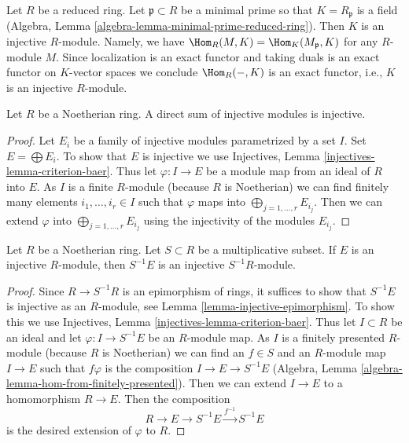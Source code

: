 \begin{example}
\label{example-reduced-ring-injective}
Let $R$ be a reduced ring. Let $\mathfrak p \subset R$ be a minimal prime
so that $K = R_\mathfrak p$ is a field
(Algebra, Lemma \ref{algebra-lemma-minimal-prime-reduced-ring}).
Then $K$ is an injective $R$-module. Namely, we have
$\Hom_R(M, K) = \Hom_K(M_\mathfrak p, K)$ for any $R$-module
$M$. Since localization is an exact functor and taking duals is
an exact functor on $K$-vector spaces we conclude $\Hom_R(-, K)$
is an exact functor, i.e., $K$ is an injective $R$-module.
\end{example}

\begin{lemma}
\label{lemma-sum-injective-modules}
Let $R$ be a Noetherian ring. A direct sum of injective modules
is injective.
\end{lemma}

\begin{proof}
Let $E_i$ be a family of injective modules parametrized by a set $I$.
Set $E = \bigoplus E_i$. To show that $E$ is injective we use
Injectives, Lemma \ref{injectives-lemma-criterion-baer}.
Thus let $\varphi : I \to E$ be a module map from an ideal of $R$
into $E$. As $I$ is a finite $R$-module (because $R$ is Noetherian)
we can find finitely many elements $i_1, \ldots, i_r \in I$
such that $\varphi$ maps into $\bigoplus_{j = 1, \ldots, r} E_{i_j}$.
Then we can extend $\varphi$ into $\bigoplus_{j = 1, \ldots, r} E_{i_j}$
using the injectivity of the modules $E_{i_j}$.
\end{proof}

\begin{lemma}
\label{lemma-localization-injective-modules}
Let $R$ be a Noetherian ring. Let $S \subset R$ be a multiplicative
subset. If $E$ is an injective $R$-module, then $S^{-1}E$ is an
injective $S^{-1}R$-module.
\end{lemma}

\begin{proof}
Since $R \to S^{-1}R$ is an epimorphism of rings, it suffices
to show that $S^{-1}E$ is injective as an $R$-module, see
Lemma \ref{lemma-injective-epimorphism}.
To show this we use Injectives, Lemma \ref{injectives-lemma-criterion-baer}.
Thus let $I \subset R$ be an ideal and let
$\varphi : I \to S^{-1} E$ be an $R$-module map.
As $I$ is a finitely presented $R$-module (because $R$ is Noetherian)
we can find an $f \in S$ and an $R$-module map $I \to E$
such that $f\varphi$ is the composition $I \to E \to S^{-1}E$
(Algebra, Lemma \ref{algebra-lemma-hom-from-finitely-presented}).
Then we can extend $I \to E$ to a homomorphism $R \to E$.
Then the composition
$$
R \to E \to S^{-1}E \xrightarrow{f^{-1}} S^{-1}E
$$
is the desired extension of $\varphi$ to $R$.
\end{proof}

